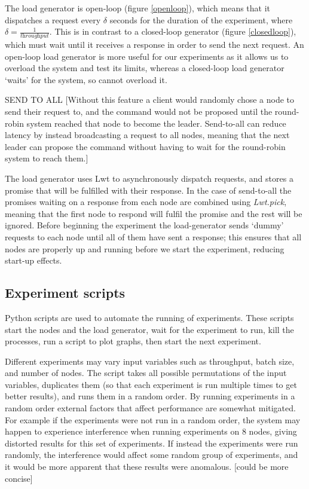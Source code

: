 The load generator is open-loop (figure \ref{openloop}), which means that it dispatches a request every $\delta$ seconds for the duration of the experiment, where $\delta = \frac{1}{\textit{throughput}}$. This is in contrast to a closed-loop generator (figure \ref{closedloop}), which must wait until it receives a response in order to send the next request. An open-loop load generator is more useful for our experiments as it allows us to overload the system and test its limits, whereas a closed-loop load generator `waits' for the system, so cannot overload it.

SEND TO ALL
[Without this feature a client would randomly chose a node to send their request to, and the command would not be proposed until the round-robin system reached that node to become the leader. Send-to-all can reduce latency by instead broadcasting a request to all nodes, meaning that the next leader can propose the command without having to wait for the round-robin system to reach them.]

The load generator uses Lwt to asynchronously dispatch requests, and stores a promise that will be fulfilled with their response. In the case of send-to-all the promises waiting on a response from each node are combined using \textit{Lwt.pick}, meaning that the first node to respond will fulfil the promise and the rest will be ignored. Before beginning the experiment the load-generator sends `dummy' requests to each node until all of them have sent a response; this ensures that all nodes are properly up and running before we start the experiment, reducing start-up effects.

\subsection{Experiment scripts} \label{experimentscripts}
Python scripts are used to automate the running of experiments. These scripts start the nodes and the load generator, wait for the experiment to run, kill the processes, run a script to plot graphs, then start the next experiment.

Different experiments may vary input variables such as throughput, batch size, and number of nodes. The script takes all possible permutations of the input variables, duplicates them (so that each experiment is run multiple times to get better results), and runs them in a random order. By running experiments in a random order external factors that affect performance are somewhat mitigated. For example if the experiments were not run in a random order, the system may happen to experience interference when running experiments on 8 nodes, giving distorted results for this set of experiments. If instead the experiments were run randomly, the interference would affect some random group of experiments, and it would be more apparent that these results were anomalous. [could be more concise]

